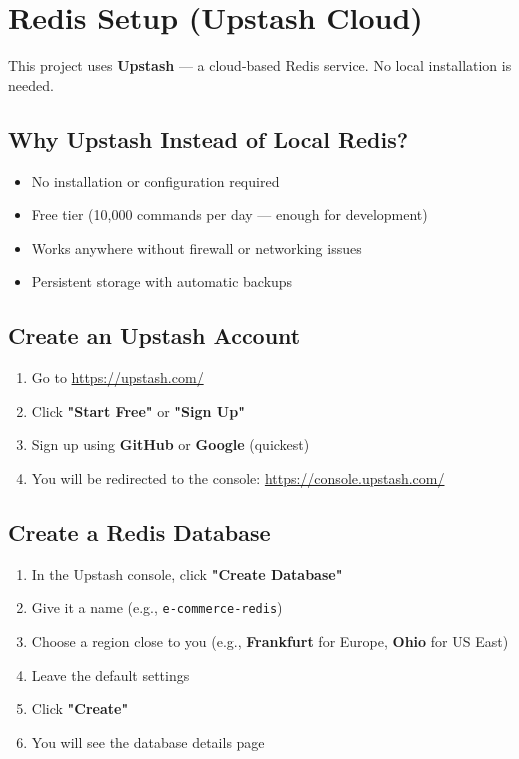\documentclass[12pt,a4paper]{article}
\begin{document}
\section{Redis Setup (Upstash Cloud)}

This project uses \textbf{Upstash} — a cloud-based Redis service. No local installation is needed.

\subsection{Why Upstash Instead of Local Redis?}

\begin{itemize}
    \item No installation or configuration required
    \item Free tier (10,000 commands per day — enough for development)
    \item Works anywhere without firewall or networking issues
    \item Persistent storage with automatic backups
\end{itemize}

\subsection{Create an Upstash Account}

\begin{enumerate}[leftmargin=*,itemsep=0.5em]
    \item Go to \url{https://upstash.com/}
    \item Click \textbf{"Start Free"} or \textbf{"Sign Up"}
    \item Sign up using \textbf{GitHub} or \textbf{Google} (quickest)
    \item You will be redirected to the console: \url{https://console.upstash.com/}
\end{enumerate}

\subsection{Create a Redis Database}

\begin{enumerate}[leftmargin=*,itemsep=0.5em]
    \item In the Upstash console, click \textbf{"Create Database"}
    \item Give it a name (e.g., \texttt{e-commerce-redis})
    \item Choose a region close to you (e.g., \textbf{Frankfurt} for Europe, \textbf{Ohio} for US East)
    \item Leave the default settings
    \item Click \textbf{"Create"}
    \item You will see the database details page
\end{enumerate}
\end{document}
